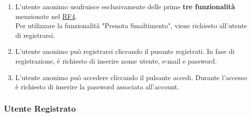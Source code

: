 \begin{enumerate}[start=16,label=\textbf{RF\theenumi}, labelwidth=4em, left=0pt, align=left, itemindent=-0.6em]
    \item \label{itm:RF16} L’utente anonimo usufruisce esclusivamente delle prime \textbf{tre funzionalità} menzionate nel \hyperref[itm:RF4]{RF4}.
    \\Per utilizzare la funzionalità "Prenota Smaltimento", viene richiesto all'utente di registrarsi.

    \item \label{itm:RF17} L’utente anonimo può registrarsi cliccando il pusante registrati. In fase di registrazione, è richiesto di inserire nome utente, e-mail e password.

    \item \label{itm:RF18} L’utente anonimo può accedere cliccando il pulsante accedi. Durante l'accesso è richiesto di inserire la password associata all'account.
    
\end{enumerate}

\subsubsection{Utente Registrato}

